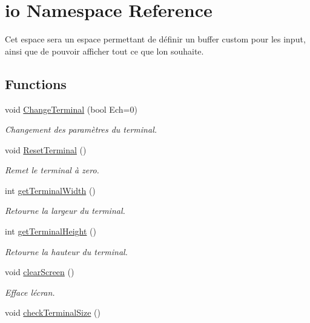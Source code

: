 \hypertarget{namespaceio}{}\section{io Namespace Reference}
\label{namespaceio}


Cet espace sera un espace permettant de définir un buffer custom pour les input, ainsi que de pouvoir afficher tout ce que l\textquotesingle{}on souhaite.  


\subsection*{Functions}
\begin{DoxyCompactItemize}
\item 
void \hyperlink{namespaceio_ac0223d0ecfee82d8cc86543604173b73}{Change\+Terminal} (bool Ech=0)
\begin{DoxyCompactList}\small\item\em Changement des paramètres du terminal. \end{DoxyCompactList}\item 
void \hyperlink{namespaceio_a44a79937063c75bdcd8f042d5f55d501}{Reset\+Terminal} ()
\begin{DoxyCompactList}\small\item\em Remet le terminal à zero. \end{DoxyCompactList}\item 
int \hyperlink{namespaceio_a71636a15a219ee1dcc177e9749cf20bc}{get\+Terminal\+Width} ()
\begin{DoxyCompactList}\small\item\em Retourne la largeur du terminal. \end{DoxyCompactList}\item 
int \hyperlink{namespaceio_ab7da8a98a7b636d1d5f0f6eb820f1f81}{get\+Terminal\+Height} ()
\begin{DoxyCompactList}\small\item\em Retourne la hauteur du terminal. \end{DoxyCompactList}\item 
void \hyperlink{namespaceio_abefd9b2fada48d5e8e260e56e868e952}{clear\+Screen} ()
\begin{DoxyCompactList}\small\item\em Efface l\textquotesingle{}écran. \end{DoxyCompactList}\item 
void \hyperlink{namespaceio_a5a0d785914a680440e4986a02b50a28e}{check\+Terminal\+Size} ()

\end{DoxyCompactItemize}
